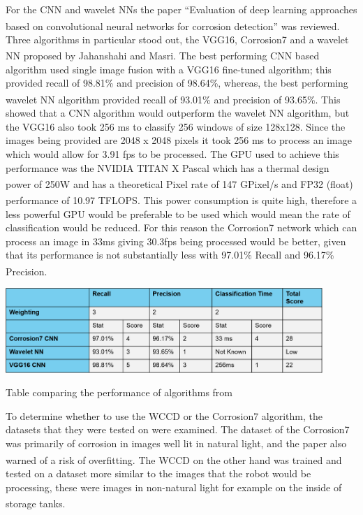 \documentclass[11pt]{article}		%
\newcommand{\supercite}[1]{\textsuperscript{\cite{#1}}}		%
\begin{document}
	        For the CNN and wavelet NNs the paper “Evaluation of deep learning approaches based on convolutional neural networks for corrosion detection”\supercite{Corrosion7}  was reviewed. Three algorithms in particular stood out, the VGG16, Corrosion7 and a wavelet NN proposed by Jahanshahi and Masri\supercite{WNN}.  The best performing CNN based algorithm used single image fusion with a VGG16 fine-tuned algorithm; this provided recall of 98.81\% and precision of 98.64\%, whereas, the best performing wavelet NN algorithm provided recall of 93.01\% and precision of 93.65\%.\supercite{Corrosion7} This showed that a CNN algorithm would outperform the wavelet NN algorithm, but the VGG16 also took 256 ms to classify 256 windows of size 128x128. Since the images being provided are 2048 x 2048 pixels it took 256 ms to process an image which would allow for 3.91 fps to be processed. The GPU used to achieve this performance was the NVIDIA TITAN X Pascal which has a thermal design power of 250W\supercite{Nvidia_Titan} and has a theoretical Pixel rate of 147 GPixel/s and FP32 (float) performance of 10.97 TFLOPS.\supercite{Corrosion7} This power consumption is quite high, therefore a less powerful GPU would be preferable to be used which would mean the rate of classification would be reduced. For this reason the Corrosion7 network which can process an image in 33ms giving 30.3fps being processed would be better, given that its performance is not substantially less with 97.01\% Recall and 96.17\% Precision.\supercite{Corrosion7}
	        \\
			\begin{table}[h]
				\centering
				\includegraphics[width=0.9\textwidth]{CNN_corrosion_table}
				\caption{Table comparing the performance of algorithms from \cite{Corrosion7}}
				\label{CNN_comparison}
			\end{table}
	        To determine whether to use the WCCD or the Corrosion7 algorithm, the datasets that they were tested on were examined. 
	        The dataset of the Corrosion7 was primarily of corrosion in images well lit in natural light, and the paper also warned of a risk of overfitting.\supercite{Corrosion7} 
	        The WCCD on the other hand was trained and tested on a dataset more similar to the images that the robot would be processing, these were images in non-natural light for example on the inside of storage tanks.\supercite{WCCD} 
\end{document}
